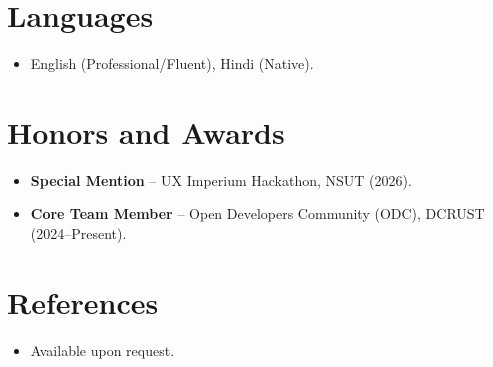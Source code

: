 \documentclass[11pt,a4paper,sans]{moderncv}
\begin{document}

\section{Languages}
\vspace{1pt}
\begin{itemize}
\item {English (Professional/Fluent), Hindi (Native).}
\end{itemize}


\section{Honors and Awards}
\vspace{1pt}
\begin{itemize}
\item{\textbf{Special Mention} -- UX Imperium Hackathon, NSUT (2026).}
\item{\textbf{Core Team Member} -- Open Developers Community (ODC), DCRUST (2024--Present).}
\end{itemize}


\section{References}
\vspace{1pt}
\begin{itemize}
\item{Available upon request.}
\end{itemize}
\end{document}
